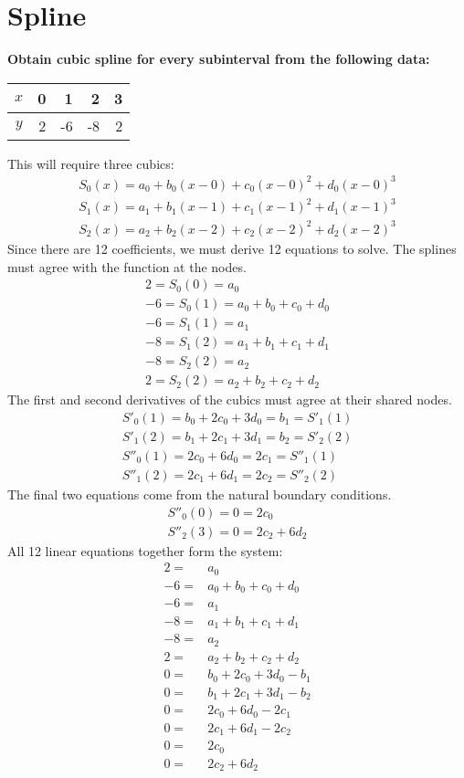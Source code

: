 \documentclass[]{book}
\begin{document}
\chapter{Spline}
\textbf{Obtain cubic spline for every subinterval from the following data:}
\begin{center}
\begin{tabular}{|c|r|r|r|r|}
\hline
$x$ & 0 & 1 & 2 & 3\\
\hline
$y$ & 2 & -6 & -8 & 2\\
\hline
\end{tabular}
\end{center} 
This will require three cubics:
\begin{eqnarray}
S_{0}(x)=a_{0}+b_{0}(x-0)+c_{0}{(x-0)}^{2}+d_{0}{(x-0)}^{3}\\
S_{1}(x)=a_{1}+b_{1}(x-1)+c_{1}{(x-1)}^{2}+d_{1}{(x-1)}^{3}\\
S_{2}(x)=a_{2}+b_{2}(x-2)+c_{2}{(x-2)}^{2}+d_{2}{(x-2)}^{3}
\end{eqnarray}
Since there are 12 coefficients, we must derive 12 equations to solve. The splines must agree with the function at the nodes.
\begin{eqnarray}
2 = S_{0}(0) = a_{0}\\
-6 = S_{0}(1) = a_{0}+b_{0}+c_{0}+d_{0}\\
-6 = S_{1}(1) = a_{1}\\
-8 = S_{1}(2) = a_{1}+b_{1}+c_{1}+d_{1}\\
-8 = S_{2}(2) = a_{2}\\
2 = S_{2}(2) = a_{2}+b_{2}+c_{2}+d_{2}
\end{eqnarray}
The first and second derivatives of the cubics must agree at their shared nodes.
\begin{eqnarray}
S'_{0}(1) = b_{0}+2c_{0}+3d_{0} = b_{1} = S'_{1}(1)\\
S'_{1}(2) = b_{1}+2c_{1}+3d_{1} = b_{2} = S'_{2}(2)\\
S''_{0}(1) = 2c_{0}+6d_{0} = 2c_{1} = S''_{1}(1)\\
S''_{1}(2) = 2c_{1}+6d_{1} = 2c_{2} = S''_{2}(2)
\end{eqnarray}
The final two equations come from the natural boundary conditions.
\begin{eqnarray}
S''_{0}(0) = 0 = 2c_{0}\\
S''_{2}(3) = 0 = 2c_{2}+6d_{2}
\end{eqnarray}
All 12 linear equations together form the system:
\begin{eqnarray}
2 = & a_{0}\\
-6 = & a_{0}+b_{0}+c_{0}+d_{0}\\
-6 = & a_{1}\\
-8 = & a_{1}+b_{1}+c_{1}+d_{1}\\
-8 = & a_{2}\\
2 = & a_{2}+b_{2}+c_{2}+d_{2}\\
0 = & b_{0}+2c_{0}+3d_{0} - b_{1}\\
0 = & b_{1}+2c_{1}+3d_{1} - b_{2}\\
0 = & 2c_{0}+6d_{0} - 2c_{1}\\
0 = & 2c_{1}+6d_{1} - 2c_{2}\\
0 = & 2c_{0}\\
0 = & 2c_{2}+6d_{2}
\end{eqnarray}
\end{document}
